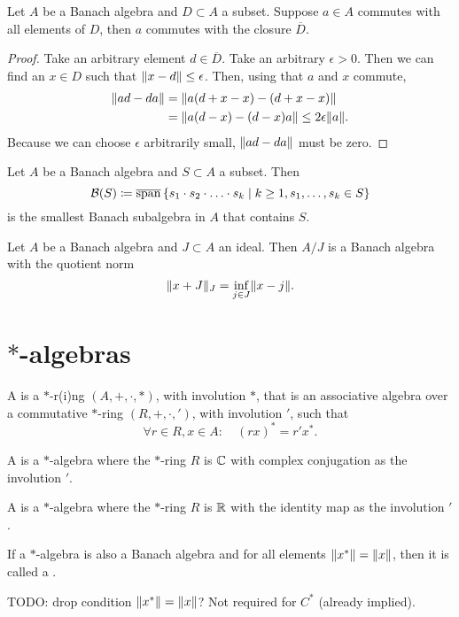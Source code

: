 \begin{lemma}
Let $A$ be a Banach algebra and $D\subset A$ a subset. Suppose $a\in A$ commutes with all elements of $D$, then $a$ commutes with the closure $\overline{D}$.
\end{lemma}
\begin{proof}
Take an arbitrary element $d\in \overline{D}$. Take an arbitrary $\epsilon >0$. Then we can find an $x\in D$ such that $\lVert x-d\rVert\leq \epsilon$. Then, using that $a$ and $x$ commute,
\begin{align*}
\lVert ad - da\rVert &= \lVert a(d+x-x) - (d+x-x)\rVert \\
&= \lVert a(d-x) - (d-x)a\rVert \leq 2\epsilon \lVert a\rVert.
\end{align*}
Because we can choose $\epsilon$ arbitrarily small, $\lVert ad - da\rVert$ must be zero.
\end{proof}

\begin{proposition} \label{smallestBanachAlgebra}
Let $A$ be a Banach algebra and $S\subset A$ a subset. Then
\[ \mathcal{B}(S) \coloneqq \overline{\operatorname{span}}\left\{ s_1\cdot s_2 \cdot \ldots \cdot s_k \;\middle|\; k\geq 1, s_1,\ldots, s_k \in S \right\} \]
is the smallest Banach subalgebra in $A$ that contains $S$.
\end{proposition}

\begin{proposition}
Let $A$ be a Banach algebra and $J\subset A$ an ideal. Then $A/J$ is a Banach algebra with the quotient norm
\[ \lVert x+J\rVert_J = \inf_{j\in J}\lVert x-j\rVert. \]
\end{proposition}

\section{$*$-algebras}
\begin{definition}
A  is a $*$-r(i)ng $(A,+,\cdot, *)$, with involution $*$, that is an associative algebra over a commutative $*$-ring $(R,+,\cdot, ')$, with involution $'$,
such that
\[ \forall r\in R, x\in A: \quad (rx)^* = r'x^*. \]

A  is a $*$-algebra where the $*$-ring $R$ is $\mathbb{C}$ with complex conjugation as the involution $'$.

A  is a $*$-algebra where the $*$-ring $R$ is $\mathbb{R}$ with the identity map as the involution $'$.

If a $*$-algebra is also a Banach algebra and for all elements $\lVert x^*\rVert =\lVert x\rVert$, then it is called a .
\end{definition}
TODO: drop condition $\lVert x^*\rVert =\lVert x\rVert$? Not required for $C^*$ (already implied).

